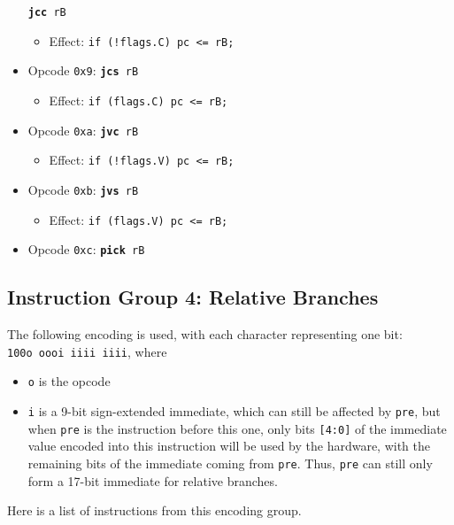 \documentclass{article}
\begin{document}
\begin{itemize}
			\texttt{\textbf{jcc} rB}
		\begin{itemize}
			\item Effect:
				\texttt{if (!flags.C) pc <= rB;}
		\end{itemize}
		\item Opcode \texttt{0x9}:
			\texttt{\textbf{jcs} rB}
		\begin{itemize}
			\item Effect:
				\texttt{if (flags.C) pc <= rB;}
		\end{itemize}
		\item Opcode \texttt{0xa}:
			\texttt{\textbf{jvc} rB}
		\begin{itemize}
			\item Effect:
				\texttt{if (!flags.V) pc <= rB;}
		\end{itemize}
		\item Opcode \texttt{0xb}:
			\texttt{\textbf{jvs} rB}
		\begin{itemize}
			\item Effect:
				\texttt{if (flags.V) pc <= rB;}
		\end{itemize}
		\item Opcode \texttt{0xc}:
			\texttt{\textbf{pick} rB}
	\end{itemize}

	\doublespacing

	\subsection{Instruction Group 4:  Relative Branches}
	The following encoding is used, with each character representing one
	bit:  \\
	\texttt{100o oooi iiii iiii}, where

	\singlespacing
	\begin{itemize}
		\item \texttt{o} is the opcode
		\item \texttt{i} is a 9-bit sign-extended immediate, which can
		still be affected by \texttt{pre}, but when \texttt{pre} is the
		instruction before this one, only bits \texttt{[4:0]} of the
		immediate value encoded into this instruction will be used by the
		hardware, with the remaining bits of the immediate coming from
		\texttt{pre}.  Thus, \texttt{pre} can still only form a 17-bit
		immediate for relative branches.
	\end{itemize}
	\doublespacing

	Here is a list of instructions from this encoding group.
\end{document}
